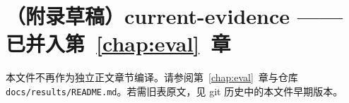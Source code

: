 \chapter*{（附录草稿）current-evidence —— 已并入第~\ref{chap:eval}~章}

\noindent 本文件不再作为独立正文章节编译。请参阅第~\ref{chap:eval}~章与仓库
\texttt{docs/results/README.md}。若需旧表原文，见 git 历史中的本文件早期版本。

